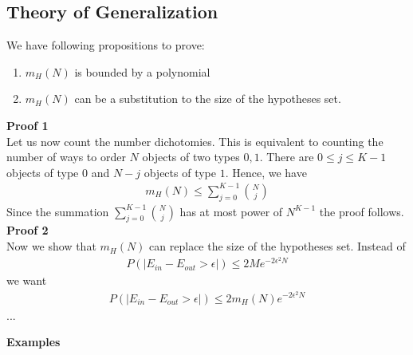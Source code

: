 \documentclass[class=article, crop=false]{standalone}
\numberwithin{equation}{section}
\begin{document}
\subsection{Theory of Generalization}
We have following propositions to prove:
\begin{enumerate}
    \item $m_H(N)$ is bounded by a polynomial
    \item $m_H(N)$ can be a substitution to the size of the hypotheses set.
\end{enumerate}
\textbf{Proof 1}\\
Let us now count the number dichotomies. This is equivalent to counting the number of ways to order $N$ objects of two types $0, 1$. There are $0\leq j\leq K-1$ objects of type $0$ and $N-j$ objects of type $1$. Hence, we have 
\begin{align*}
    m_H(N)\leq \sum\limits_{j=0}^{K-1}{N\choose j}    
\end{align*}
Since the summation $\sum\limits_{j=0}^{K-1}{N\choose j}$ has at most power of $N^{K-1}$ the proof follows.
\textbf{Proof 2}\\

Now we show that $m_H(N)$ can replace the size of the hypotheses set. Instead of 
\begin{align*}
    P(|E_{in}-E_{out}>\epsilon|)\leq 2Me^{-2\epsilon^2N}
\end{align*}
we want 
\begin{align*}
    P(|E_{in}-E_{out}>\epsilon|)\leq 2m_H(N)e^{-2\epsilon^2N}
\end{align*}
...

\textbf{Examples}\\
\end{document}
